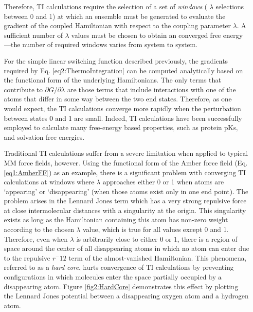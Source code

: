 Therefore, TI calculations require the selection of a set of \emph{windows} (\ie
$\lambda$ selections between 0 and 1) at which an ensemble must be generated to
evaluate the gradient of the coupled Hamiltonian with respect to the coupling
parameter $\lambda$. A sufficient number of $\lambda$ values must be chosen to
obtain an converged free energy---the number of required windows varies from
system to system.

For the simple linear switching function described previously, the gradients
required by Eq. \ref{eq2:ThermoIntegration} can be computed analytically based
on the functional form of the underlying Hamiltonians. The only terms that
contribute to $\partial G / \partial \lambda$ are those terms that include
interactions with one of the atoms that differ in some way between the two end
states. Therefore, as one would expect, the TI calculations converge more
rapidly when the perturbation between states 0 and 1 are small. Indeed, TI
calculations have been successfully employed to calculate many free-energy based
properties, such as protein pKs, \cite{Davies_JAmChemSoc_2002_v124_p6594}
and solvation free energies. \cite{Steinbrecher2011}

Traditional TI calculations suffer from a severe limitation when applied to
typical MM force fields, however. Using the functional form of the Amber force
field (Eq. \ref{eq1:AmberFF}) as an example, there is a significant problem with
converging TI calculations at windows where $\lambda$ approaches either 0 or 1
when atoms are `appearing' or `disappearing' (\ie when those atoms exist only in
one end point). The problem arises in the Lennard Jones term which has a very
strong repulsive force at close intermolecular distances with a singularity at
the origin. This singularity exists as long as the Hamiltonian containing this
atom has non-zero weight according to the chosen $\lambda$ value, which is true
for all values except 0 and 1. Therefore, even when $\lambda$ is arbitrarily
close to either 0 or 1, there is a region of space around the center of all
disappearing atoms in which no atom can enter due to the repulsive $r^-{12}$
term of the almost-vanished Hamiltonian. This phenomena, referred to as a
\emph{hard core}, hurts convergence of TI calculations by preventing
configurations in which molecules enter the space partially occupied by a
disappearing atom. Figure \ref{fig2:HardCore} demonstrates this effect by
plotting the Lennard Jones potential between a disappearing oxygen atom and a
hydrogen atom.

